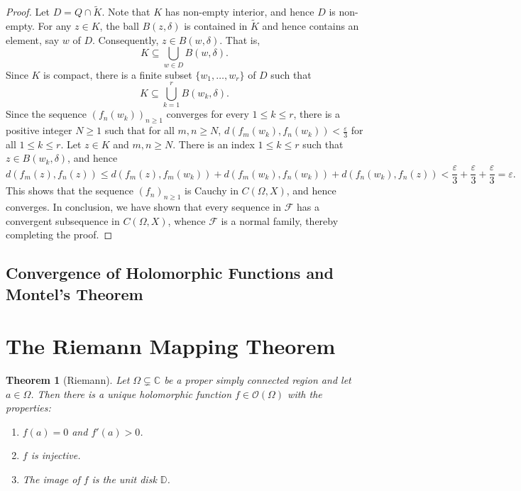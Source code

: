 \documentclass[11pt]{article}
\theoremstyle{thmstyle}
\newtheorem{theorem}{Theorem}[section]
\theoremstyle{defstyle}
\newcommand{\bbC}{\mathbb{C}}
\newcommand{\bbD}{\mathbb{D}} %
\newcommand{\scrF}{\mathscr{F}}
\newcommand{\scrO}{\mathscr{O}} %
\newcommand{\wt}[1]{\widetilde{#1}}
\renewcommand{\le}{\leqslant}
\renewcommand{\ge}{\geqslant}
\begin{document}
\begin{proof}
    Let $D = Q\cap\wt K$. Note that $K$ has non-empty interior, and hence $D$ is non-empty. For any $z\in K$, the ball $B(z, \delta)$ is contained in $\wt K$ and hence contains an element, say $w$ of $D$. Consequently, $z\in B(w,\delta)$. That is, 
    \begin{equation*}
        K\subseteq\bigcup_{w\in D} B(w,\delta).
    \end{equation*}
    Since $K$ is compact, there is a finite subset $\{w_1,\dots,w_r\}$ of $D$ such that 
    \begin{equation*}
        K\subseteq\bigcup_{k = 1}^r B(w_k, \delta).
    \end{equation*}
    Since the sequence $(f_n(w_k))_{n\ge 1}$ converges for every $1\le k\le r$, there is a positive integer $N\ge 1$ such that for all $m,n\ge N$, $d(f_m(w_k), f_n(w_k)) < \frac{\varepsilon}{3}$ for all $1\le k\le r$. Let $z\in K$ and $m,n\ge N$. There is an index $1\le k\le r$ such that $z\in B(w_k, \delta)$, and hence 
    \begin{equation*}
        d(f_m(z), f_n(z))\le d(f_m(z), f_m(w_k)) + d(f_m(w_k), f_n(w_k)) + d(f_n(w_k), f_n(z)) < \frac{\varepsilon}{3} + \frac{\varepsilon}{3} + \frac{\varepsilon}{3} = \varepsilon.
    \end{equation*}
    This shows that the sequence $(f_n)_{n\ge 1}$ is Cauchy in $C(\Omega, X)$, and hence converges. In conclusion, we have shown that every sequence in $\scrF$ has a convergent subsequence in $C(\Omega, X)$, whence $\scrF$ is a normal family, thereby completing the proof.
\end{proof}

\subsection{Convergence of Holomorphic Functions and Montel's Theorem}



\section{The Riemann Mapping Theorem}

\begin{theorem}[Riemann]
    Let $\Omega\subsetneq\bbC$ be a proper simply connected region and let $a\in\Omega$. Then there is a unique holomorphic function $f\in\scrO(\Omega)$ with the properties: 
    \begin{enumerate}[label=(\roman*)]
        \item $f(a) = 0$ and $f'(a) > 0$. 
        \item $f$ is injective.
        \item The image of $f$ is the unit disk $\bbD$.
    \end{enumerate}
\end{theorem}
\end{document}
